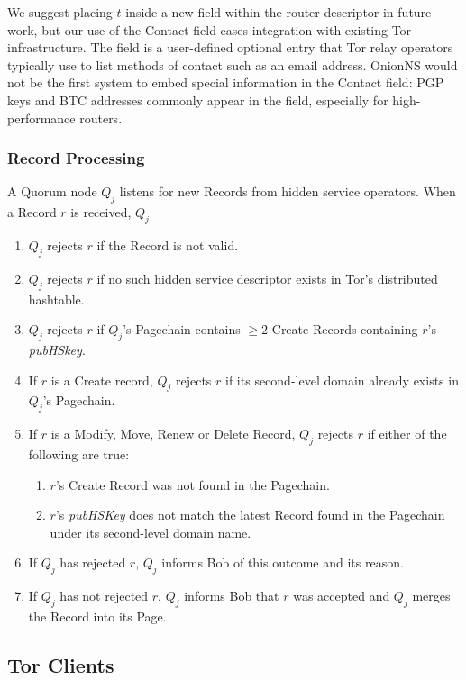We suggest placing $ t $ inside a new field within the router descriptor in future work, but our use of the Contact field eases integration with existing Tor infrastructure. The field is a user-defined optional entry that Tor relay operators typically use to list methods of contact such as an email address. OnionNS would not be the first system to embed special information in the Contact field: PGP keys and BTC addresses commonly appear in the field, especially for high-performance routers.

\subsubsection{Record Processing}

A Quorum node $ Q_{j} $ listens for new Records from hidden service operators. When a Record $ r $ is received, $ Q_{j} $

\begin{enumerate}
	\item $ Q_{j} $ rejects $ r $ if the Record is not valid.
	\item $ Q_{j} $ rejects $ r $ if no such hidden service descriptor exists in Tor's distributed hashtable.
	\item $ Q_{j} $ rejects $ r $ if $ Q_{j} $'s Pagechain contains $ \ge 2 $ Create Records containing $ r $'s \emph{pubHSkey}.
	\item If $ r $ is a Create record, $ Q_{j} $ rejects $ r $ if its second-level domain already exists in $ Q_{j} $'s Pagechain.
	\item If $ r $ is a Modify, Move, Renew or Delete Record, $ Q_{j} $ rejects $ r $ if either of the following are true:
		\begin{enumerate}
			\item $ r $'s Create Record was not found in the Pagechain.
			\item $ r $'s \emph{pubHSKey} does not match the latest Record found in the Pagechain under its second-level domain name.
		\end{enumerate}
	\item If $ Q_{j} $ has rejected $ r $, $ Q_{j} $ informs Bob of this outcome and its reason.
	\item If $ Q_{j} $ has not rejected $ r $, $ Q_{j} $ informs Bob that $ r $ was accepted and $ Q_{j} $ merges the Record into its Page.
\end{enumerate}

\subsection{Tor Clients}
\label{sec:ProtoTorClients}

